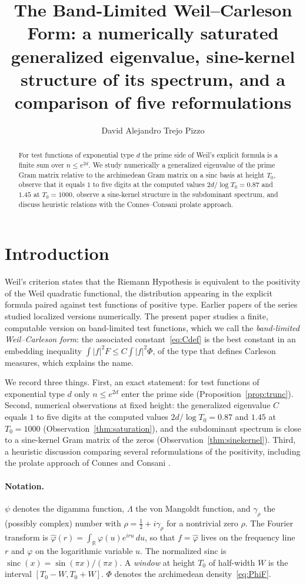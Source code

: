 \documentclass[11pt]{amsart}
\title[The Band-Limited Weil--Carleson Form]{The Band-Limited Weil--Carleson Form: a numerically saturated generalized eigenvalue, sine-kernel structure of its spectrum, and a comparison of five reformulations}
\author{David Alejandro Trejo Pizzo}
\theoremstyle{definition}
\theoremstyle{remark}
\newcommand{\Cband}{C}
\newcommand{\half}{\tfrac12}
\begin{document}
\begin{abstract}
For test functions of exponential type $d$ the prime side of Weil's explicit formula is a finite sum over
$n\le e^{2d}$. We study numerically a generalized eigenvalue of the prime Gram matrix relative to the
archimedean Gram matrix on a sinc basis at height $T_0$, observe that it equals $1$ to five digits at the
computed values $2d/\log T_0=0.87$ and $1.45$ at $T_0=1000$, observe a sine-kernel structure in the subdominant spectrum, and
discuss heuristic relations with the Connes--Consani prolate approach.
\end{abstract}

\maketitle

\tableofcontents
\newpage

\section{Introduction}\label{sec:intro}
Weil's criterion \cite{Weil1952,Bombieri2000} states that the Riemann Hypothesis is equivalent to the
positivity of the Weil quadratic functional, the distribution appearing in the explicit formula paired
against test functions of positive type. Earlier papers of the series \cite{Pdetector,Pkrein,Pstable,Panatomy} studied localized versions numerically. The present
paper studies a finite, computable version on band-limited test functions, which we call the
\emph{band-limited Weil--Carleson form}: the associated constant~\eqref{eq:Cdef} is the best
constant in an embedding inequality $\int|f|^2F\le \Cband\int|f|^2\Phi$, of the type that defines Carleson
measures, which explains the name.

We record three things. First, an exact statement: for test functions of exponential type $d$ only
$n\le e^{2d}$ enter the prime side (Proposition~\ref{prop:trunc}). Second, numerical observations at fixed
height: the generalized eigenvalue $\Cband$ equals $1$ to five digits at the computed values $2d/\log T_0=0.87$ and $1.45$
at $T_0=1000$ (Observation~\ref{thm:saturation}), and the subdominant spectrum is close to a sine-kernel Gram
matrix of the zeros (Observation~\ref{thm:sinekernel}). Third, a heuristic discussion comparing several
reformulations of the positivity, including the prolate approach of Connes and Consani
\cite{CC2021,CCprolate}.

\paragraph{Notation.} $\psi$ denotes the digamma function, $\Lambda$ the von Mangoldt function, and
$\gamma_\rho$ the (possibly complex) number with $\rho=\half+i\gamma_\rho$ for a nontrivial zero $\rho$.
The Fourier transform is $\hat\varphi(r)=\int_{\mathbb R}\varphi(u)e^{iru}\,du$, so that $f=\hat\varphi$ lives
on the frequency line $r$ and $\varphi$ on the logarithmic variable $u$. The normalized sinc is
$\operatorname{sinc}(x)=\sin(\pi x)/(\pi x)$. A \emph{window} at height $T_0$ of half-width $W$ is the
interval $[T_0-W,T_0+W]$. $\Phi$ denotes the archimedean density~\eqref{eq:PhiF}.
\end{document}
